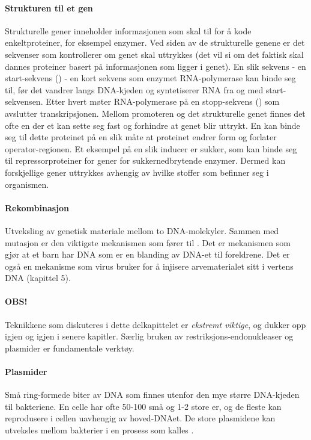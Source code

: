 \paragraph{Strukturen til et gen} Strukturelle gener  inneholder informasjonen som skal til for å kode enkeltproteiner, for eksempel enzymer. Ved siden av de strukturelle genene er det sekvenser som kontrollerer om genet skal uttrykkes (det vil si om det faktisk skal dannes proteiner basert på informasjonen som ligger i genet). En slik sekvens - en start-sekvens () - en kort sekvens som enzymet RNA-polymerase kan binde seg til, før det vandrer langs DNA-kjeden og syntetiserer RNA fra og med start-sekvensen. Etter hvert møter RNA-polymerase på en stopp-sekvens () som avslutter transkripsjonen. Mellom promoteren og det strukturelle genet finnes det ofte en  der et  kan sette seg fast og forhindre at genet blir uttrykt. En  kan binde seg til dette proteinet på en slik måte at proteinet endrer form og forlater operator-regionen. Et eksempel på en slik inducer er sukker, som kan binde seg til repressorproteiner for gener for sukkernedbrytende enzymer. Dermed kan forskjellige gener uttrykkes avhengig av hvilke stoffer som befinner seg i organismen.

\paragraph{Rekombinasjon} Utveksling av genetisk materiale mellom to DNA-molekyler. Sammen med mutasjon er  den viktigste mekanismen som fører til . Det er mekanismen som gjør at et barn har DNA som er en blanding av DNA-et til foreldrene. Det er også en mekanisme som virus bruker for å injisere arvematerialet sitt i vertens DNA (kapittel 5).


\paragraph{OBS!} Teknikkene som diskuteres i dette delkapittelet er \emph{ekstremt viktige}, og dukker opp igjen og igjen i senere kapitler. Særlig bruken av restriksjons-endonukleaser og plasmider er fundamentale verktøy.

\paragraph{Plasmider} Små ring-formede biter av DNA som finnes utenfor den mye større DNA-kjeden til bakteriene. En celle har ofte 50-100 små og 1-2 store er, og de fleste kan reprodusere i cellen uavhengig av hoved-DNAet. De store plasmidene kan utveksles mellom bakterier i en prosess som kalles .

